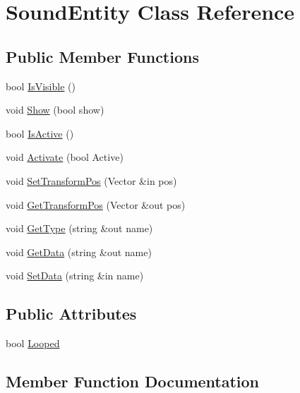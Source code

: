 \hypertarget{class_sound_entity}{}\section{Sound\+Entity Class Reference}
\label{class_sound_entity}
\subsection*{Public Member Functions}
\begin{DoxyCompactItemize}
\item 
bool \hyperlink{class_sound_entity_a7d967b71a7b702571fe0a3701ad8a6b7}{Is\+Visible} ()
\item 
void \hyperlink{class_sound_entity_a776c403e92ba49fd1d953da505b1b900}{Show} (bool show)
\item 
bool \hyperlink{class_sound_entity_a88497c33c80efd65174cd4babd6ee1e7}{Is\+Active} ()
\item 
void \hyperlink{class_sound_entity_af967ae18304c458205c772328b00e8b2}{Activate} (bool Active)
\item 
void \hyperlink{class_sound_entity_a47f93f009ae90659d2754d1745f9be29}{Set\+Transform\+Pos} (Vector \&in pos)
\item 
void \hyperlink{class_sound_entity_ae2995641487cd493b1243d5d73b97517}{Get\+Transform\+Pos} (Vector \&out pos)
\item 
void \hyperlink{class_sound_entity_a2dccd8c3d3070b1f186227997fe22b0a}{Get\+Type} (string \&out name)
\item 
void \hyperlink{class_sound_entity_ad3010f15ef3dc1942601d570ea155553}{Get\+Data} (string \&out name)
\item 
void \hyperlink{class_sound_entity_a1916c9261ea80e9cbc88bcc535417c3b}{Set\+Data} (string \&in name)
\end{DoxyCompactItemize}
\subsection*{Public Attributes}
\begin{DoxyCompactItemize}
\item 
bool \hyperlink{class_sound_entity_af851c6811baeb51e471afee9769badbd}{Looped}
\end{DoxyCompactItemize}


\subsection{Member Function Documentation}
\hypertarget{class_sound_entity_af967ae18304c458205c772328b00e8b2}{}\label{class_sound_entity_af967ae18304c458205c772328b00e8b2} 
